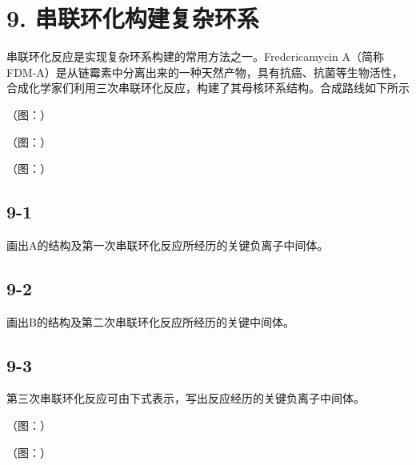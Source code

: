 \section*{9. 串联环化构建复杂环系}
串联环化反应是实现复杂环系构建的常用方法之一。Fredericamycin A（简称FDM-A）是从链霉素中分离出来的一种天然产物，具有抗癌、抗菌等生物活性，合成化学家们利用三次串联环化反应，构建了其母核环系结构。合成路线如下所示

（图：）

（图：）

（图：）

\subsection*{9-1}
画出A的结构及第一次串联环化反应所经历的关键负离子中间体。

\subsection*{9-2}
画出B的结构及第二次串联环化反应所经历的关键中间体。

\subsection*{9-3}
第三次串联环化反应可由下式表示，写出反应经历的关键负离子中间体。

（图：）

（图：）
